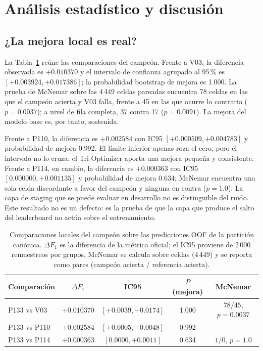 \section{Análisis estadístico y discusión}
\label{sec:discusion}

\subsection{¿La mejora local es real?}

La Tabla~\ref{tab:estadistica} reúne las comparaciones del campeón. Frente a
V03, la diferencia observada es $+0.010370$ y el intervalo de confianza
agrupado al 95\,\% es $[+0.003924, +0.017386]$; la probabilidad bootstrap de
mejora es 1.000. La prueba de McNemar sobre las 4\,449 celdas pareadas
encuentra 78 celdas en las que el campeón acierta y V03 falla, frente a 45 en
las que ocurre lo contrario ($p=0.0037$); a nivel de fila completa, 37 contra
17 ($p=0.0091$). La mejora del modelo base es, por tanto, sostenida.

Frente a P110, la diferencia es $+0.002584$ con IC95
$[+0.000509, +0.004783]$ y probabilidad de mejora 0.992. El límite inferior
apenas roza el cero, pero el intervalo no lo cruza: el Tri-Optimizer aporta
una mejora pequeña y consistente. Frente a P114, en cambio, la diferencia es
$+0.000363$ con IC95 $[0.000000, +0.001135]$ y probabilidad de mejora 0.634;
McNemar encuentra una sola celda discordante a favor del campeón y ninguna en
contra ($p=1.0$). La capa de staging que se puede evaluar en desarrollo no es
distinguible del ruido. Este resultado no es un defecto: es la prueba de que
la capa que produce el salto del leaderboard no actúa sobre el
entrenamiento.

\begin{table}[t]
\centering
\caption{Comparaciones locales del campeón sobre las predicciones OOF de la
partición canónica. $\Delta F_1$ es la diferencia de la métrica oficial; el
IC95 proviene de 2\,000 remuestreos por grupos. McNemar se calcula sobre
celdas (4\,449) y se reporta como pares (campeón acierta / referencia acierta).}
\label{tab:estadistica}
\small
\begin{tabular*}{\textwidth}{@{\extracolsep{\fill}}lcccc}
\toprule
Comparación & $\Delta F_1$ & IC95 & $P$(mejora) & McNemar \\
\midrule
P133 vs V03 & $+0.010370$ & $[+0.0039, +0.0174]$ & 1.000 & $78/45$, $p=0.0037$ \\
P133 vs P110 & $+0.002584$ & $[+0.0005, +0.0048]$ & 0.992 & --- \\
P133 vs P114 & $+0.000363$ & $[0.0000, +0.0011]$ & 0.634 & $1/0$, $p=1.0$ \\
\bottomrule
\end{tabular*}
\end{table}

